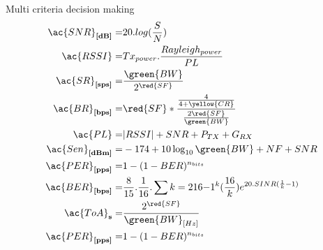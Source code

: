\begin{frame}{Multi criteria decision making}
\begin{align}
\ac{SNR}_{\textbf{[dB]}}=     & 20.log(\frac{S}{N})                                                                           \\
\ac{RSSI} =                   & Tx_{power}.\frac{Rayleigh_{power}}{PL}                                                        \\
\ac{SR}_{\textbf{[sps]}}=     & \frac{\green{BW}}{2^{\red{SF}}}                                                               \\
\ac{BR}_{\textbf{[bps]}} =    & \red{SF} * \frac{\frac{4}{4+\yellow{CR}}}{\frac{2 \red{SF}}{\green{BW}}}                      \\
\ac{PL}=                      & |R S S I|+S N R+P_{T X}+G_{R X}                                                               \\
\ac{Sen}_{\textbf{[dBm]}} =   & -174+10 \log _{10} \green{BW} + NF + SNR                                                      \\
\ac{PER}_{\textbf{[pps]}}   = & 1-(1-BER)^{n_{bits}}                                                                          \\
\ac{BER}_{\textbf{[bps]}}   = & \frac{8}{15}.\frac{1}{16}.\sum{k=2}{16}{-1^{k}(\frac{16}{k})e^{20.SINR(\frac{1}{k}-1)}}       \\
\ac{ToA}_{\textbf{s}}    =    & \frac{2^{\red{SF}}}{\green{BW}_{[Hz]}}                                                        \\
\ac{PER}_{\textbf{[pps]}}   = & 1-(1-BER)^{n_{bits}}                                                                          \\
\end{align}
\end{frame}


